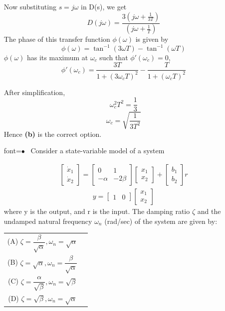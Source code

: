\documentclass[journal,12pt,twocolumn]{IEEEtran}
\renewcommand\thesection{\arabic{section}}
\begin{document}
\begin{enumerate}[label=\arabic*.,ref=\thesection.\theenumi]
{}
  Now substituting $s = j\omega$ in D(s), we get\\
   $$D(j\omega) = \frac{3(j\omega+\frac{1}{3T})}{(j\omega+\frac{1}{T})}$$ 
   The phase of this transfer function $\phi(\omega)$ is given by
   $$\phi(\omega) = \tan^{-1}(3\omega T)-\tan^{-1}(\omega T)$$
   $\phi(\omega)$ has its maximum at $\omega_c$ such that $\phi '(\omega_c)=0$, 
   $$\phi '(\omega_c) = \frac{3T}{1+(3\omega _c T)^2}-\frac{T}{1+(\omega _c T)^2}$$
   


{}
  After simplification,
  $$\omega _c ^2T^2 = \frac{1}{3}$$
  $$\omega _c = \sqrt{\frac{1}{3T^2}}$$
  Hence \textbf{(b)} is the correct option.


\item
[font=$\bullet$~\normalfont\scshape\color{blue!50!black}]
Consider a state-variable model of a system

\begin{align}
\left[ \begin{array}{c} \dot{x}_1 \\ \dot{x}_2 
\end{array} 
\right] = 
\begin{bmatrix} 0 & 1 \\ -\alpha & -2\beta 
\end{bmatrix} 
\left[ 
\begin{array}{c} x_1 \\ x_2 
\end{array}
\right]
+
\left[
\begin{array}{c} b_1 \\ b_2 
\end{array}
\right]
r
\end{align}
\begin{align}
y =  \begin{bmatrix} 1 & 0 \end{bmatrix}\left[ 
\begin{array}{c} x_1 \\ x_2 
\end{array}
\right]
\end{align}
where y is the output, and r is the input. The damping ratio $\zeta$ and the undamped natural
frequency $\omega_n$ (rad/sec) of the system are given by:
\begin{tabular}{cc}
    (A) $\zeta = \dfrac{\beta}{\sqrt{\alpha}} , \omega_n = \sqrt{\alpha}$   \\
    (B) $\zeta = \sqrt{\alpha} , \omega_n = \dfrac{\beta}{\sqrt{\alpha}} $  \\
    (C) $\zeta = \dfrac{\alpha}{\sqrt{\beta}} , \omega_n = \sqrt{\beta}  $  \\
    (D) $\zeta = \sqrt{\beta} , \omega_n = \sqrt{\alpha}  $  \\
    

\end{tabular}
\end{enumerate}
\end{document}
